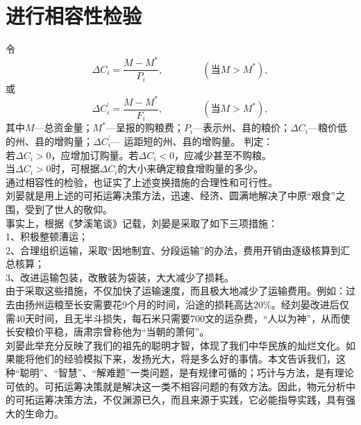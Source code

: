 \section{进行相容性检验}
令
\begin{displaymath}
\Delta C_i=\frac{M-M^*}{P_i},\qquad\qquad(\mbox{当}M>M^*),
\end{displaymath}
\indent{}或
\begin{displaymath}
\Delta C_i^{'}=\frac{M-M^*}{F_i},\qquad\qquad(\mbox{当}M>M^*),
\end{displaymath}
其中$M$—总资金量；$M^*$—呈报的购粮费；$P_i$—表示州、县的粮价；$\Delta C_i$—粮价低的州、县的增购量；$\Delta C_i^{'}$— 运距短的州、县的增购量。
\indent{}判定：
\\\indent{}若$\Delta C_i>0$，应增加订购量。若$\Delta C_i<0$，应减少甚至不购粮。
\\\indent{}当$\Delta C_i>0$时，可根据$\Delta C_i$的大小来确定粮食增购量的多少。
\\\indent{}通过相容性的检验，也证实了上述变换措施的合理性和可行性。
\\\indent{}刘晏就是用上述的可拓运筹决策方法，迅速、经济、圆满地解决了中原“艰食”之围，受到了世人的敬仰。
\\\indent{}事实上，根据《梦溪笔谈》记载\cite{ref04}，刘晏是采取了如下三项措施：
\\\indent{}1、积极整顿漕运；
\\\indent{}2、合理组织运输，采取“因地制宜、分段运输”的办法，费用开销由逐级核算到汇总核算；
\\\indent{}3、改进运输包装，改散装为袋装，大大减少了损耗。
\\\indent{}由于采取这些措施，不仅加快了运输速度，而且极大地减少了运输费用。例如：过去由扬州运粮至长安需要花9个月的时间，沿途的损耗高达$20\%$。经刘晏改进后仅需40天时间，且无半斗损失，每石米只需要700文的运杂费，“人以为神”，从而使长安粮价平稳，唐肃宗曾称他为“当朝的萧何”。
\\\indent{}刘晏此举充分反映了我们的祖先的聪明才智，体现了我们中华民族的灿烂文化。如果能将他们的经验模拟下来，发扬光大，将是多么好的事情。本文告诉我们，这种“聪明”、“智慧”、“解难题”一类问题，是有规律可循的；巧计与方法，是有理论可依的。可拓运筹决策就是解决这一类不相容问题的有效方法。因此，物元分析中的可拓运筹决策方法，不仅渊源已久，而且来源于实践，它必能指导实践，具有强大的生命力。